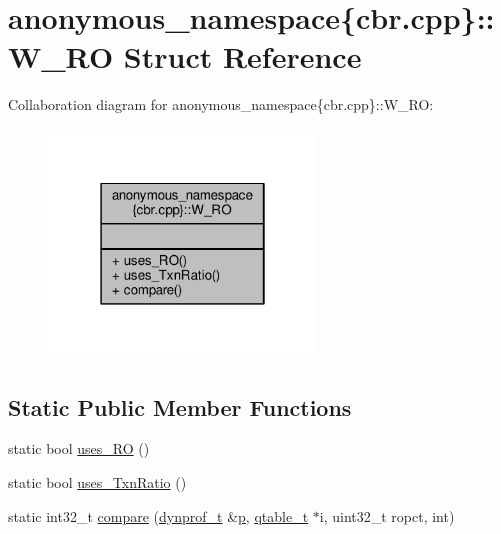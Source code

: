 \hypertarget{structanonymous__namespace_02cbr_8cpp_03_1_1W__RO}{\section{anonymous\-\_\-namespace\{cbr.\-cpp\}\-:\-:W\-\_\-\-R\-O Struct Reference}
\label{structanonymous__namespace_02cbr_8cpp_03_1_1W__RO}
}


Collaboration diagram for anonymous\-\_\-namespace\{cbr.\-cpp\}\-:\-:W\-\_\-\-R\-O\-:
\nopagebreak
\begin{figure}[H]
\begin{center}
\leavevmode
\includegraphics[width=202pt]{structanonymous__namespace_02cbr_8cpp_03_1_1W__RO__coll__graph}
\end{center}
\end{figure}
\subsection*{Static Public Member Functions}
\begin{DoxyCompactItemize}
\item 
static bool \hyperlink{structanonymous__namespace_02cbr_8cpp_03_1_1W__RO_a234b4c86b91e6f04201e090232554f12}{uses\-\_\-\-R\-O} ()
\item 
static bool \hyperlink{structanonymous__namespace_02cbr_8cpp_03_1_1W__RO_a4a131f52268c9f32d65cf21176e091b2}{uses\-\_\-\-Txn\-Ratio} ()
\item 
static int32\-\_\-t \hyperlink{structanonymous__namespace_02cbr_8cpp_03_1_1W__RO_a2471edc6f56e2a720e6a0e3c2e0aa919}{compare} (\hyperlink{structstm_1_1dynprof__t}{dynprof\-\_\-t} \&\hyperlink{counted__ptr_8hpp_a5c9f59d7c24e3fd6ceae319a968fc3e0}{p}, \hyperlink{structstm_1_1qtable__t}{qtable\-\_\-t} $\ast$i, uint32\-\_\-t ropct, int)
\end{DoxyCompactItemize}


